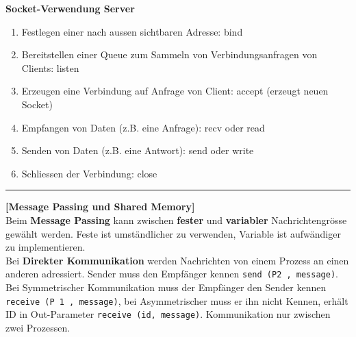 \documentclass[8pt]{extarticle}
\let\oldtextbf\textbf
\renewcommand{\textbf}{\tiny\oldtextbf}
\begin{document}
\begin{multicols*}{5}
	\vspace{5pt}
	\textbf{Socket-Verwendung Server}
	\begin{enumerate} [noitemsep, topsep=0pt, leftmargin=*]
		\item Festlegen einer nach aussen sichtbaren Adresse: bind
		\item Bereitstellen einer Queue zum Sammeln von Verbindungsanfragen von Clients: listen
		\item Erzeugen eine Verbindung auf Anfrage von Client: accept (erzeugt neuen Socket)
		\item Empfangen von Daten (z.B. eine Anfrage): recv oder read
		\item Senden von Daten (z.B. eine Antwort): send oder write
		\item Schliessen der Verbindung: close
	\end{enumerate}
	
	\vspace{5pt}
	\rule{\linewidth}{0.4pt}
	\textbf{[Message Passing und Shared Memory]}\\
	
	Beim \textbf{Message Passing} kann zwischen \textbf{fester} und \textbf{variabler} Nachrichtengrösse gewählt werden. Feste ist umständlicher zu verwenden, Variable ist aufwändiger zu implementieren.\\
	
	Bei \textbf{Direkter Kommunikation} werden Nachrichten von einem Prozess an einen anderen adressiert. Sender muss den Empfänger kennen \texttt{send (P2 , message)}. Bei Symmetrischer Kommunikation muss der Empfänger den Sender kennen \texttt{receive (P 1 , message)}, bei Asymmetrischer muss er ihn nicht Kennen, erhält ID in Out-Parameter \texttt{receive (id, message)}. Kommunikation nur zwischen zwei Prozessen.\\
	

\end{multicols*}
\end{document}
